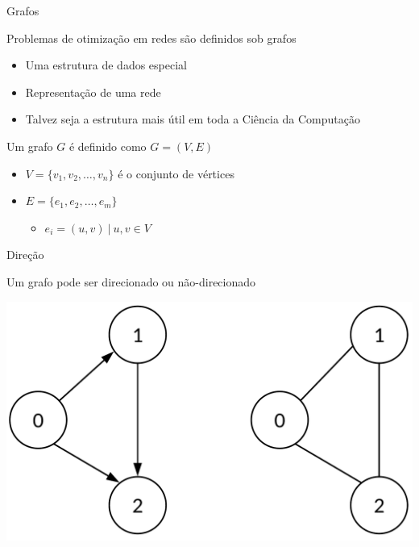 \documentclass[compress,mathserif]{beamer}
\begin{document}

\begin{frame}{Grafos}

Problemas de otimização em redes são definidos sob grafos
\begin{itemize}
    \item Uma estrutura de dados especial
    \item Representação de uma rede
    \item Talvez seja a estrutura mais útil em toda a Ciência da Computação
\end{itemize}

\vspace{1cm}

Um grafo $G$ é definido como $G = (V, E)$
\begin{itemize}
    \item $V = \{v_1, v_2, \ldots, v_n\}$ é o conjunto de vértices
    \item $E = \{e_1, e_2, \ldots, e_m\}$
    \begin{itemize}
        \item $e_i = (u, v)~|~u, v \in V$
    \end{itemize}
\end{itemize}
\end{frame}


\begin{frame}{Direção}

Um grafo pode ser direcionado ou não-direcionado

\vspace{0.5cm}

\centering \includegraphics[width=\textwidth]{images/grafos.png}

\end{frame}
\end{document}
